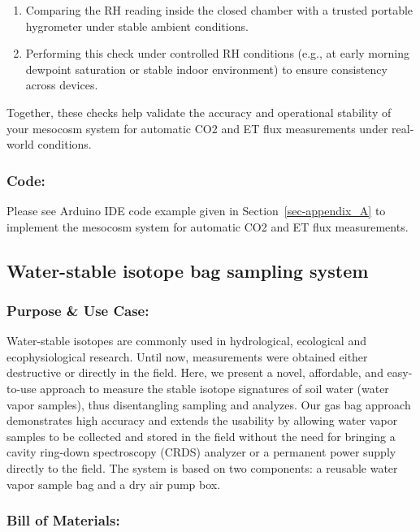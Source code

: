 \documentclass[
  11pt,
  letterpaper,
]{book}
\begin{document}
\begin{enumerate}
\def\labelenumi{\arabic{enumi}.}
\item
  Comparing the RH reading inside the closed chamber with a trusted
  portable hygrometer under stable ambient conditions.
\item
  Performing this check under controlled RH conditions (e.g., at early
  morning dewpoint saturation or stable indoor environment) to ensure
  consistency across devices.
\end{enumerate}

Together, these checks help validate the accuracy and operational
stability of your mesocosm system for automatic CO2 and ET flux
measurements under real-world conditions.

\subsubsection{Code:}\label{sec-mesocosm-flux-code}

Please see Arduino IDE code example given in
Section~\ref{sec-appendix_A} to implement the mesocosm system for
automatic CO2 and ET flux measurements.

\subsection{Water-stable isotope bag sampling
system}\label{sec-isotope-bag}

\subsubsection{Purpose \& Use Case:}\label{sec-isotope-bag-purpose}

Water-stable isotopes are commonly used in hydrological, ecological and
ecophysiological research. Until now, measurements were obtained either
destructive or directly in the field. Here, we present a novel,
affordable, and easy-to-use approach to measure the stable isotope
signatures of soil water (water vapor samples), thus disentangling
sampling and analyzes. Our gas bag approach demonstrates high accuracy
and extends the usability by allowing water vapor samples to be
collected and stored in the field without the need for bringing a cavity
ring-down spectroscopy (CRDS) analyzer or a permanent power supply
directly to the field. The system is based on two components: a reusable
water vapor sample bag and a dry air pump box.

\subsubsection{Bill of Materials:}\label{sec-isotope-bag-bom}
\end{document}
